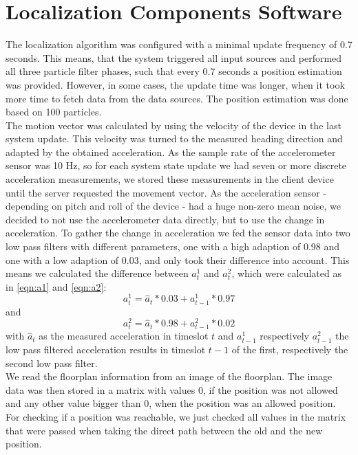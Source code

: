\section{Localization Components Software}
The localization algorithm was configured with a minimal update frequency of 0.7 seconds. This means, that the system triggered all input sources and performed all three particle filter phases, such that every 0.7 seconds a position estimation was provided. However, in some cases, the update time was longer, when it took more time to fetch data from the data sources. The position estimation was done based on 100 particles.\\
\noindent\hspace*{5mm}%
The motion vector was calculated by using the velocity of the device in the last system update. This velocity was turned to the measured heading direction and adapted by the obtained acceleration.  As the sample rate of the accelerometer sensor was 10 Hz, so for each system state update we had seven or more discrete acceleration measurements, we stored these measurements in the client device until the server requested the movement vector. As the acceleration sensor - depending on pitch and roll of the device - had a huge non-zero mean noise, we decided to not use the accelerometer data directly, but to use the change in acceleration. To gather the change in acceleration we fed the sensor data into two low pass filters with different parameters, one with a high adaption of 0.98 and one with a low adaption of 0.03, and only took their difference into account. This means we calculated the difference between $a_{t}^1$ and $a_{t}^2$, which were calculated as in \ref{eqn:a1} and \ref{eqn:a2}:
\begin{equation}
a_{t}^{1} = \hat{a}_{t}*0.03 + a_{t-1}^{1} * 0.97
\label{eqn:a1}
\end{equation}
and
\begin{equation}
a_{t}^{2} = \hat{a}_{t}*0.98 + a_{t-1}^{2} * 0.02
\label{eqn:a2}
\end{equation}
with $\hat{a}_{t}$ as the measured acceleration in timeslot $t$ and $a_{t-1}^{1}$ respectively $a_{t-1}^{2}$ the low pass filtered acceleration results in timeslot $t-1$ of the first, respectively the second low pass filter.\\
\noindent\hspace*{5mm}%
We read the floorplan information from an image of the floorplan. The image data was then stored in a matrix with values 0, if the position was not allowed and any other value bigger than 0, when the position was an allowed position. For checking if a position was reachable, we just checked all values in the matrix that were passed when taking the direct path between the old and the new position.\\

